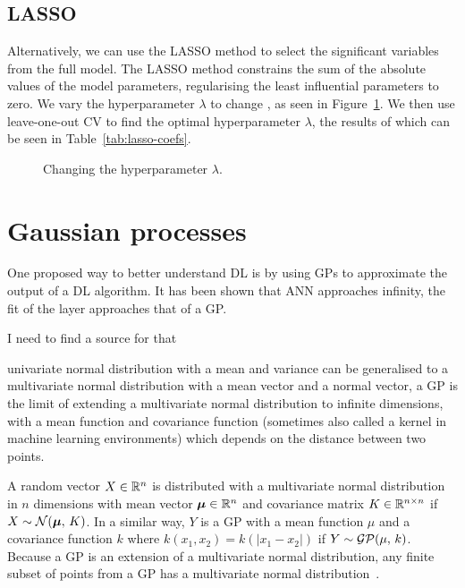 \subsection{\acl{LASSO}}

Alternatively, we can use the \ac{LASSO} method to select the significant variables from the full model.
The \ac{LASSO} method constrains the sum of the absolute values of the model parameters, regularising the least influential parameters to zero.
We vary the hyperparameter \(\lambda\) to change , as seen in Figure~\ref{fig:lasso-lambda}.
We then use leave-one-out \ac{CV} to find the optimal hyperparameter \(\lambda\), the results of which can be seen in Table~\ref{tab:lasso-coefs}.

\begin{figure}[htbp]
	\centering
	
	\caption{Changing the hyperparameter \(\lambda\).}
	\label{fig:lasso-lambda}
\end{figure}


\section{Gaussian processes}

One proposed way to better understand \ac{DL} is by using \acp{GP} to approximate the output of a \ac{DL} algorithm.
It has been shown that  \acl{ANN} approaches infinity, the fit of the layer approaches that of a \ac{GP}.

\begin{todo}
I need to find a source for that
\end{todo}

 univariate normal distribution with a mean and variance can be generalised to a multivariate normal distribution with a mean vector and a normal vector, a \ac{GP} is the limit of extending a multivariate normal distribution to infinite dimensions, with a mean function and covariance function (sometimes also called a kernel in machine learning environments) which depends on the distance between two points.

A random vector \(X \in \mathbb{R}{}^n\) is distributed with a multivariate normal distribution in \(n\) dimensions with mean vector \(\bm{\mu} \in \mathbb{R}{}^n\) and covariance matrix \(K \in \mathbb{R}^{n \times n}\) if \(X \sim \mathcal{N}(\bm{\mu},\, K)\).
In a similar way, \(Y\) is a \ac{GP} with a mean function \(\mu\) and a covariance function \(k\) where \(k(x_1, x_2) = k(\left|x_1 - x_2\right|)\) if \(Y \sim \mathcal{GP}(\mu,\, k)\).
Because a \ac{GP} is an extension of a multivariate normal distribution, any finite subset of points from a \ac{GP} has a multivariate normal distribution~\autocite[515]{williams1996}.

